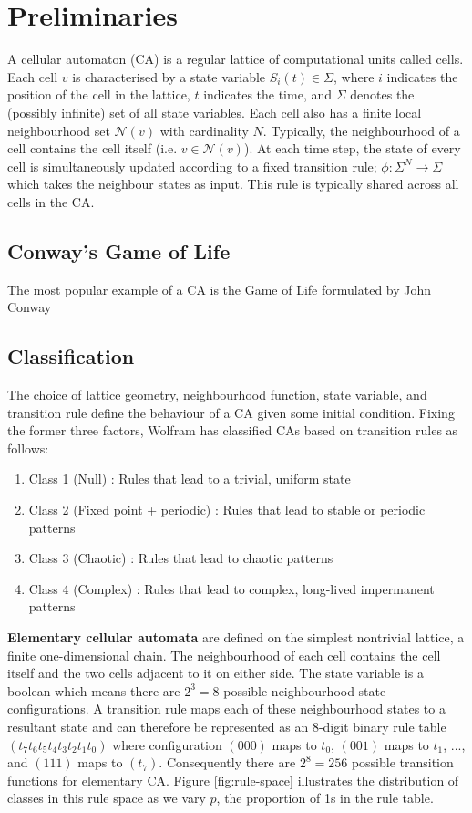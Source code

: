 \chapter{Preliminaries}

A cellular automaton (CA) is a regular lattice of computational units called cells. Each cell $v$ is characterised by a state variable $S_i(t) \in \Sigma$, where $i$ indicates the position of the cell in the lattice, $t$ indicates the time, and $\Sigma$ denotes the (possibly infinite) set of all state variables. Each cell also has a finite local neighbourhood set $\mathcal{N}(v)$ with cardinality $N$. Typically, the neighbourhood of a cell contains the cell itself (i.e. $v \in \mathcal{N}(v)$). At each time step, the state of every cell is simultaneously updated according to a fixed transition rule; $\phi:\Sigma^N \to \Sigma$ which takes the neighbour states as input. This rule is typically shared across all cells in the CA.

\section{Conway's Game of Life}
The most popular example of a CA is the Game of Life formulated by John Conway 


\section{Classification}

The choice of lattice geometry, neighbourhood function, state variable, and transition rule define the behaviour of a CA given some initial condition. Fixing the former three factors, Wolfram \cite{wolfram1986theory} has classified CAs based on transition rules as follows:
\begin{enumerate}
  \item Class 1 (Null) : Rules that lead to a trivial, uniform state
  \item Class 2 (Fixed point + periodic) : Rules that lead to stable or periodic patterns
  \item Class 3 (Chaotic) : Rules that lead to chaotic patterns
  \item Class 4 (Complex) : Rules that lead to complex, long-lived impermanent patterns
\end{enumerate}

\textbf{Elementary cellular automata} are defined on the simplest nontrivial lattice, a finite one-dimensional chain. The neighbourhood of each cell contains the cell itself and the two cells adjacent to it on either side. The state variable is a boolean which means there are $2^3 = 8$ possible neighbourhood state configurations. A transition rule maps each of these neighbourhood states to a resultant state and can therefore be represented as an 8-digit binary rule table $(t_7t_6t_5t_4t_3t_2t_1t_0)$ where configuration $(000)$ maps to $t_0$, $(001)$ maps to $t_1$, ..., and $(111)$ maps to $(t_7)$. Consequently there are $2^8=256$ possible transition functions for elementary CA. Figure \ref{fig:rule-space} illustrates the distribution of classes in this rule space as we vary $p$, the proportion of 1s in the rule table. \\

